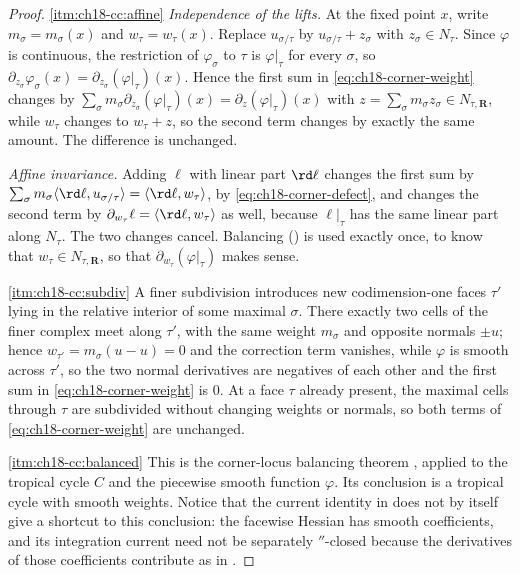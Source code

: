 \begin{proof}
\cref{itm:ch18-cc:affine}  \emph{Independence of the lifts.}  At the fixed
point $x$, write $m_\sigma=m_\sigma(x)$ and $w_\tau=w_\tau(x)$.  Replace
$u_{\sigma/\tau}$ by $u_{\sigma/\tau}+z_\sigma$ with $z_\sigma\in N_\tau$.
Since $\varphi$ is continuous, the restriction of $\varphi_\sigma$ to $\tau$
is $\varphi|_\tau$ for every $\sigma$, so
$\partial_{z_\sigma}\varphi_\sigma(x)=\partial_{z_\sigma}(\varphi|_\tau)(x)$.
Hence the first sum in \eqref{eq:ch18-corner-weight} changes by
$\sum_\sigma m_\sigma\partial_{z_\sigma}(\varphi|_\tau)(x)
 =\partial_{z}(\varphi|_\tau)(x)$ with
$z=\sum_\sigma m_\sigma z_\sigma\in N_{\tau,\mathbf R}$, while $w_\tau$ changes to
$w_\tau+z$, so the second term changes by exactly the same amount.  The
difference is unchanged.

\emph{Affine invariance.}  Adding $\ell$ with linear part $\rd\ell$ changes
the first sum by
$\sum_\sigma m_\sigma\langle \rd\ell,u_{\sigma/\tau}\rangle
 =\langle \rd\ell,w_\tau\rangle$, by \eqref{eq:ch18-corner-defect}, and
changes the second term by $\partial_{w_\tau}\ell=\langle \rd\ell,w_\tau
\rangle$ as well, because $\ell|_\tau$ has the same linear part along
$N_\tau$.  The two changes cancel.  Balancing
() is used exactly once, to know that
$w_\tau\in N_{\tau,\mathbf R}$, so that
$\partial_{w_\tau}(\varphi|_\tau)$ makes sense.

\cref{itm:ch18-cc:subdiv}  A finer subdivision introduces new
codimension-one faces $\tau'$ lying in the relative interior of some
maximal $\sigma$.  There exactly two cells of the finer complex meet along
$\tau'$, with the same weight $m_\sigma$ and opposite normals $\pm u$; hence
$w_{\tau'}=m_\sigma(u-u)=0$ and the correction term vanishes, while
$\varphi$ is smooth across $\tau'$, so the two normal derivatives are
negatives of each other and the first sum in
\eqref{eq:ch18-corner-weight} is $0$.  At a face $\tau$ already present, the
maximal cells through $\tau$ are subdivided without changing weights or
normals, so both terms of \eqref{eq:ch18-corner-weight} are unchanged.

\cref{itm:ch18-cc:balanced}  This is the corner-locus balancing theorem
\cite[Proposition~1.12]{GK17}, applied to the tropical cycle
$C$ and the piecewise smooth function $\varphi$.  Its conclusion is a
tropical cycle with smooth weights.  Notice that the current identity in
 does not by itself give a shortcut to this
conclusion: the facewise Hessian has smooth coefficients, and its
integration current need not be separately $\dprime$-closed because the
derivatives of those coefficients contribute as in
.
\end{proof}

